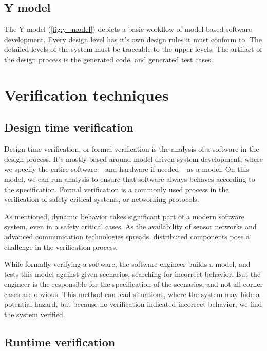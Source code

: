 \subsection{Y model}

The Y model (\cref{fig:y_model}) depicts a basic workflow of model based software development. Every design level has it's own design rules it must conform to. The detailed levels of the system must be traceable to the upper levels. The artifact of the design process is the generated code, and generated test cases.

\section{Verification techniques}
\label{sec:verification_techniques}

\subsection{Design time verification}

Design time verification, or formal verification is the analysis of a software in the design process. It's mostly based around model driven system development, where we specify the entire software\,---and hardware if needed---\,as a model. On this model, we can run analysis to ensure that software always behaves according to the specification. Formal verification is a commonly used process in the verification of safety critical systems, or networking protocols.

As mentioned, dynamic behavior takes significant part of a modern software system, even in a safety critical cases. As the availability of sensor networks and advanced communication technologies spreads, distributed components pose a challenge in the verification process.

While formally verifying a software, the software engineer builds a model, and tests this model against given scenarios, searching for incorrect behavior. But the engineer is the responsible for the specification of the scenarios, and not all corner cases are obvious. This method can lead situations, where the system may hide a potential hazard, but because no verification indicated incorrect behavior, we find the system verified.

\subsection{Runtime verification}

